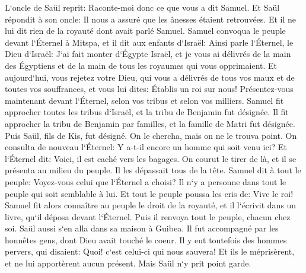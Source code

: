 \verse L`oncle de Saül reprit: Raconte-moi donc ce que vous a dit Samuel. 
\verse Et Saül répondit à son oncle: Il nous a assuré que les ânesses étaient retrouvées. Et il ne lui dit rien de la royauté dont avait parlé Samuel. 
\verse Samuel convoqua le peuple devant l`Éternel à Mitspa, 
\verse et il dit aux enfants d`Israël: Ainsi parle l`Éternel, le Dieu d`Israël: J`ai fait monter d`Égypte Israël, et je vous ai délivrés de la main des Égyptiens et de la main de tous les royaumes qui vous opprimaient. 
\verse Et aujourd`hui, vous rejetez votre Dieu, qui vous a délivrés de tous vos maux et de toutes vos souffrances, et vous lui dites: Établis un roi sur nous! Présentez-vous maintenant devant l`Éternel, selon vos tribus et selon vos milliers. 
\verse Samuel fit approcher toutes les tribus d`Israël, et la tribu de Benjamin fut désignée. 
\verse Il fit approcher la tribu de Benjamin par familles, et la famille de Matri fut désignée. Puis Saül, fils de Kis, fut désigné. On le chercha, mais on ne le trouva point. 
\verse On consulta de nouveau l`Éternel: Y a-t-il encore un homme qui soit venu ici? Et l`Éternel dit: Voici, il est caché vers les bagages. 
\verse On courut le tirer de là, et il se présenta au milieu du peuple. Il les dépassait tous de la tête. 
\verse Samuel dit à tout le peuple: Voyez-vous celui que l`Éternel a choisi? Il n`y a personne dans tout le peuple qui soit semblable à lui. Et tout le peuple poussa les cris de: Vive le roi! 
\verse Samuel fit alors connaître au peuple le droit de la royauté, et il l`écrivit dans un livre, qu`il déposa devant l`Éternel. Puis il renvoya tout le peuple, chacun chez soi. 
\verse Saül aussi s`en alla dans sa maison à Guibea. Il fut accompagné par les honnêtes gens, dont Dieu avait touché le coeur. 
\verse Il y eut toutefois des hommes pervers, qui disaient: Quoi! c`est celui-ci qui nous sauvera! Et ils le méprisèrent, et ne lui apportèrent aucun présent. Mais Saül n`y prit point garde. 

